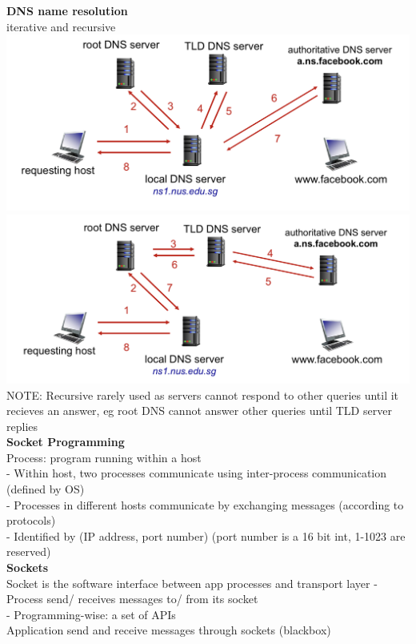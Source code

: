 \documentclass[10pt, a4paper]{article}
\newcommand{\red}[1]{{\color{red}#1}}
\begin{document}
\begin{multicols*}{3}
		\textbf{DNS name resolution}\\
		iterative and recursive\\
		\includegraphics[scale=.12]{./assets/iterativeDns}\\
		\includegraphics[scale=.12]{./assets/recursiveDns}\\
		\red{NOTE}: Recursive rarely used as servers cannot respond to other queries until it recieves an answer, eg root DNS cannot answer other queries until TLD server replies\\

		\textbf{Socket Programming}\\
		Process: program running within a host\\
		- Within host, two processes communicate using \red{inter-process communication (defined by OS)}\\
		- Processes in different hosts communicate by \red{exchanging messages (according to protocols)}\\
		- Identified by \red{(IP address, port number)} (port number is a 16 bit int, 1-1023 are reserved)\\

		\textbf{Sockets}\\
		Socket is the software interface between app processes and transport layer
		- Process send/ receives messages to/ from its \red{socket}\\
		- Programming-wise: a set of APIs\\
		Application send and receive messages through sockets (blackbox)\\


\end{multicols*}
\end{document}
